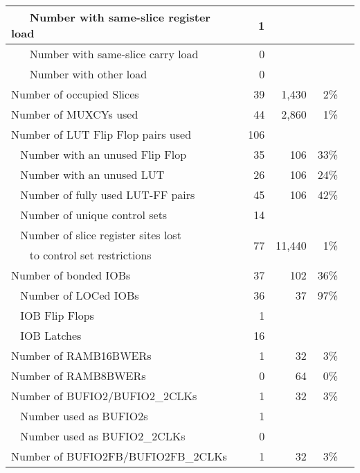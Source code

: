 {\begin{longtable}{|l|r|r|r|r|}
	\midrule
	\,\,\,\,\,\,\,\,\,\,Number with same-slice register load & 1     &       &       &  \\
	\midrule
	\,\,\,\,\,\,\,\,\,\,Number with same-slice carry load & 0     &       &       &  \\
	\midrule
	\,\,\,\,\,\,\,\,\,\,Number with other load & 0     &       &       &  \\
	\midrule
	Number of occupied Slices & 39    & 1,430 & 2\%   &  \\
	\midrule
	Number of MUXCYs used & 44    & 2,860 & 1\%   &  \\
	\midrule
	Number of LUT Flip Flop pairs used & 106   &       &       &  \\
	\midrule
	\,\,\,\,\,Number with an unused Flip Flop & 35    & 106   & 33\%  &  \\
	\midrule
	\,\,\,\,\,Number with an unused LUT & 26    & 106   & 24\%  &  \\
	\midrule
	\,\,\,\,\,Number of fully used LUT-FF pairs & 45    & 106   & 42\%  &  \\
	\midrule
	\,\,\,\,\,Number of unique control sets & 14    &       &       &  \\
	\midrule
	\,\,\,\,\,Number of slice register sites lost & \multirow{2}[2]{*}{77} & \multirow{2}[2]{*}{11,440} & \multirow{2}[2]{*}{1\%} & \multirow{2}[2]{*}{} \\
	\,\,\,\,\,\,\,\,\,\,to control set restrictions &       &       &       & \\
	\midrule
	Number of bonded IOBs & 37    & 102   & 36\%  &  \\
	\midrule
	\,\,\,\,\,Number of LOCed IOBs & 36    & 37    & 97\%  &  \\
	\midrule
	\,\,\,\,\,IOB Flip Flops & 1     &       &       &  \\
	\midrule
	\,\,\,\,\,IOB Latches & 16    &       &       &  \\
	\midrule
	Number of RAMB16BWERs & 1     & 32    & 3\%   &  \\
	\midrule
	Number of RAMB8BWERs & 0     & 64    & 0\%   &  \\
	\midrule
	Number of BUFIO2/BUFIO2\_2CLKs & 1     & 32    & 3\%   &  \\
	\midrule
	\,\,\,\,\,Number used as BUFIO2s & 1     &       &       &  \\
	\midrule
	\,\,\,\,\,Number used as BUFIO2\_2CLKs & 0     &       &       &  \\
	\midrule
	Number of BUFIO2FB/BUFIO2FB\_2CLKs & 1     & 32    & 3\%   &  \\

\end{longtable}}
